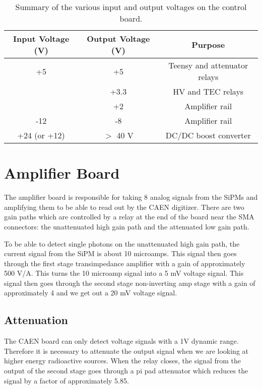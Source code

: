 \documentclass[12pt,openright,twoside]{report}
\begin{document}
\begin{table}
\centering
\begin{tabular}{c c c}
Input Voltage (V) & Output Voltage (V) & Purpose \\ \hline
+5  & +5   & Teensy and attenuator relays \\
    & +3.3 & HV and TEC relays \\
    & +2   & Amplifier rail \\ \hline
-12 & -8   & Amplifier rail \\ \hline
+24 (or +12) & $>$ 40 V   & DC/DC boost converter
\end{tabular}
\caption{Summary of the various input and output voltages on the control board.}
\label{table:power}
\end{table}

\section{Amplifier Board}
The amplifier board is responsible for taking 8 analog signals from the SiPMs
and amplifying them to be able to read out by the CAEN digitizer. There are two
gain paths which are controlled by a relay at the end of the board near the SMA
connectors: the unattenuated high gain path and the attenuated low gain path.

To be able to detect single photons on the unattenuated high gain path, the
current signal from the SiPM is about 10 microamps. This signal then goes
through the first stage transimpedance amplifier with a gain of approximately
500 V/A. This turns the 10 microamp signal into a 5 mV voltage signal. This
signal then goes through the second stage non-inverting amp stage with a gain
of approximately 4 and we get out a 20 mV voltage signal.

\subsection{Attenuation}

The CAEN board can only detect voltage signals with a 1V dynamic range.
Therefore it is necessary to attenuate the output signal when we are looking at
higher energy radioactive sources. When the relay closes, the signal from the
output of the second stage goes through a pi pad attenuator which reduces the
signal by a factor of approximately 5.85.
\end{document}

